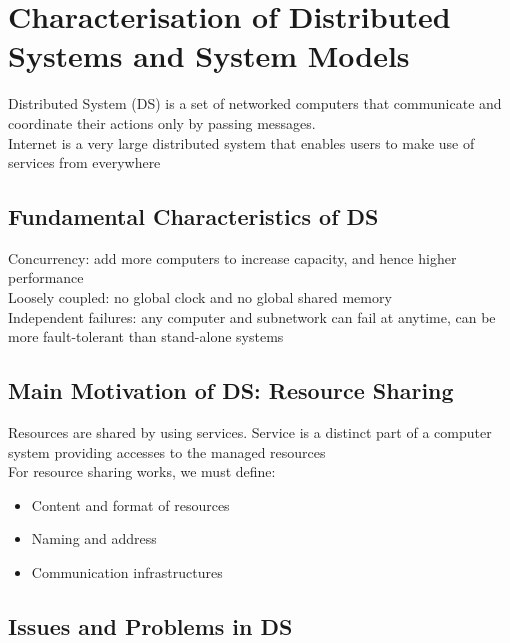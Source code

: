 \chapter{Characterisation of Distributed Systems and System Models}

\begin{multicols*}{2}

\noindent Distributed System (DS) is a set of networked computers that communicate and coordinate their actions only by passing messages.\\

\noindent Internet is a very large distributed system that enables users to make use of services from everywhere

\section{Fundamental Characteristics of DS}

\noindent Concurrency: add more computers to increase capacity, and hence higher performance \\

\noindent Loosely coupled: no global clock and no global shared memory \\

\noindent Independent failures: any computer and subnetwork can fail at anytime, can be more fault-tolerant than stand-alone systems

\section {Main Motivation of DS: Resource Sharing}

\noindent Resources are shared by using services. Service is a distinct part of a computer system providing accesses to the managed resources \\

\noindent For resource sharing works, we must define:
\begin{itemize}
    \item Content and format of resources
    \item Naming and address
    \item Communication infrastructures
\end{itemize}

\section{Issues and Problems in DS}


\end{multicols*}
